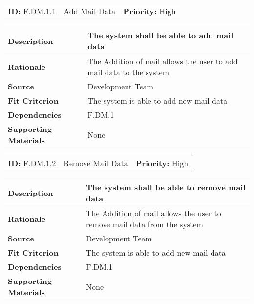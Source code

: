 \begin{table}[H]
    \begin{tabularx}{\textwidth}{| l | X | l |}
        \hline
        \textbf{ID:} F.DM.1.1 & Add Mail Data & \textbf{Priority:} High \\
    \end{tabularx}
    \begin{tabularx}{\textwidth}{| l | X |}
        \hline
        \textbf{Description} & The system shall be able to add mail data \\ \hline
        \textbf{Rationale} & The Addition of mail allows the user to add mail data to the system\\ \hline
        \textbf{Source} & Development Team\\ \hline
        \textbf{Fit Criterion} & The system is able to add new mail data\\ \hline
        \textbf{Dependencies} & F.DM.1 \\ \hline
        \textbf{Supporting Materials} & None \\ \hline
    \end{tabularx}
\end{table}

\begin{table}[H]
    \begin{tabularx}{\textwidth}{| l | X | l |}
        \hline
        \textbf{ID:} F.DM.1.2 & Remove Mail Data & \textbf{Priority:} High \\
    \end{tabularx}
    \begin{tabularx}{\textwidth}{| l | X |}
        \hline
        \textbf{Description} & The system shall be able to remove mail data \\ \hline
        \textbf{Rationale} & The Addition of mail allows the user to remove mail data from the system\\ \hline
        \textbf{Source} & Development Team\\ \hline
        \textbf{Fit Criterion} & The system is able to add new mail data\\ \hline
        \textbf{Dependencies} & F.DM.1 \\ \hline
        \textbf{Supporting Materials} & None \\ \hline
    \end{tabularx}
\end{table}

